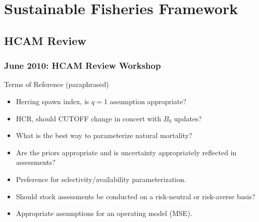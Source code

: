 


\section{Sustainable Fisheries Framework} %
\label{sec:sustainable_fisheries_framework}


\subsection{HCAM Review} %
\label{sub:hcam_review}

\begin{frame}[t]\frametitle{June 2010: HCAM Review Workshop}
	\begin{block}	{Terms of Reference (paraphrased)}
		\begin{itemize}
			\item<1-> Herring spawn index, is $q=1$ assumption appropriate?
			\item<1-> HCR, should CUTOFF change in concert with $B_0$ updates?
			\item<1-> What is the best way to parameterize natural mortality?
			\item<1-> Are the priors appropriate and is uncertainty appropriately reflected in assessments?
			\item<1-> Preference for selectivity/availability parameterization.
			\item<1-> Should stock assessments be conducted on a risk-neutral or risk-averse basis?
			\item<2-> Appropriate assumptions for an operating model (MSE).
		\end{itemize}
	\end{block}
\end{frame}


